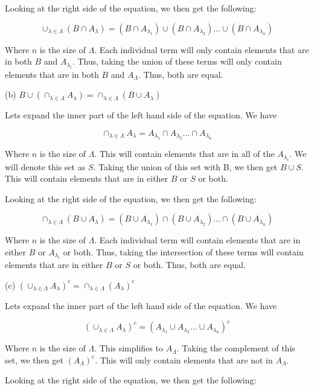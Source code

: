 \documentclass[addpoints]{exam}
\begin{document}
\begin{questions}
Looking at the right side of the equation, we then get the following:

\[\cup_{\lambda \in \Lambda}(B \cap A_{\lambda}) = (B \cap A_{\lambda_1}) \cup (B \cap A_{\lambda_2}) ... \cup (B \cap A_{\lambda_n})\]

Where $n$ is the size of $\Lambda$. Each individual term will only contain elements that are in both $B$ and $A_{\lambda_i}$. Thus, taking the
union of these terms will only contain elements that are in both $B$ and $A_\Lambda$. Thus, both are equal. 

(b) $B \cup (\cap_{\lambda \in \Lambda}A_{\lambda}) = \cap_{\lambda \in \Lambda}(B \cup A_{\lambda})$

Lets expand the inner part of the left hand side of the equation. We have

\[\cap_{\lambda \in \Lambda}A_{\lambda} = A_{\lambda_1} \cap A_{\lambda_2} ... \cap A_{\lambda_n}\]

Where $n$ is the size of $\Lambda$. This will contain elements that are in all of the $A_{\lambda_i}$. We will denote this set as $S$. 
Taking the union of this set with B, we then get $B \cup S$. This will contain elements that are in either $B$ or $S$ or both.

Looking at the right side of the equation, we then get the following:

\[\cap_{\lambda \in \Lambda}(B \cup A_{\lambda}) = (B \cup A_{\lambda_1}) \cap (B \cup A_{\lambda_2}) ... \cap (B \cup A_{\lambda_n})\]

Where $n$ is the size of $\Lambda$. Each individual term will contain elements that are in either $B$ or $A_{\lambda_i}$ or both. Thus, taking the
intersection of these terms will contain elements that are in either $B$ or $S$ or both. Thus, both are equal.

(c) $(\cup_{\lambda \in \Lambda}A_{\lambda})^c = \cap_{\lambda \in \Lambda}(A_{\lambda})^c$

Lets expand the inner part of the left hand side of the equation. We have

\[(\cup_{\lambda \in \Lambda}A_{\lambda})^c = (A_{\lambda_1} \cup A_{\lambda_2} ... \cup A_{\lambda_n})^c\]

Where $n$ is the size of $\Lambda$. This simplifies to $A_\Lambda$. Taking the complement of this set, we then get
$(A_\Lambda)^c$. This will only contain elements that are not in $A_\Lambda$.

Looking at the right side of the equation, we then get the following:


\end{questions}
\end{document}
